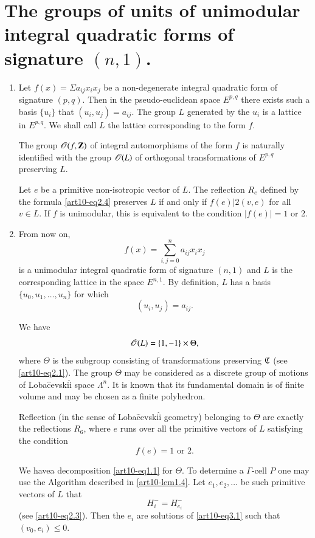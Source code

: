 \section{The groups of units of unimodular integral quadratic forms of signature $(n,1)$.}\label{art10-sec3}

\begin{enumerate}
\item Let $f(x) = \Sigma a_{ij} x_i x_j$ be a non-degenerate integral quadratic form of signature $(p,q)$. Then in the pseudo-euclidean space $E^{p,q}$ there exists such a basis $\{u_i\}$ that $(u_i, u_j) = a_{ij}$. The group $L$ generated by the $u_i$ is a lattice in $E^{p,q}$. We shall call $L$ the lattice corresponding to the form $f$.

The group $\mathscr{O}(f,\mathbf{Z})$ of integral automorphisms of the form $f$ is naturally identified with the group $\mathscr{O}(L)$ of orthogonal transformations of $E^{p,q}$ preserving $L$.

Let $e$ be a primitive non-isotropic vector of $L$. The reflection $R_e$ defined by the formula \eqref{art10-eq2.4} preserves $L$ if and only if $f(e) \big| 2(v,e)$ for all $v \in L$. If $f$ is unimodular, this is equivalent to the condition $|f(e)| = 1$ or 2. 

\item From now on,
$$
f(x) = \sum\limits^n_{i, j =0} a_{ij} x_i x_j
$$
is a unimodular integral quadratic form of signature $(n,1)$ and $L$ is the corresponding lattice in the space $E^{n,1}$. By definition, $L$ has a basis $\{u_0, u_1, \ldots, u_n\}$ for which
$$
(u_i, u_j) = a_{ij}.
$$

We have 
$$
\mathscr{O}(L) = \{1, -1\} \times \Theta,
$$
where $\Theta$ is the subgroup consisting of transformations preserving $\mathfrak{C}$ (see \ref{art10-eq2.1}). The group $\Theta$ may be considered as a discrete group of motions of Loba$\hat{\text{c}}$evski$\hat{\text{i}}$ space $\Lambda^n$. It is known \cite{art10-key2} that its fundamental domain is of finite volume and may be chosen as a finite polyhedron.

Reflection (in the sense of Loba$\hat{\text{c}}$evski$\hat{\text{i}}$ geometry) belonging to $\Theta$ are exactly the reflections $R_6$, where $e$ runs over all the primitive vectors of $L$ satisfying the condition
\setcounter{equation}{0}
\begin{equation}
f(e) = 1 \text{ or } 2. \label{art10-eq3.1}
\end{equation}

We have\pageoriginale a decomposition \eqref{art10-eq1.1} for $\Theta$. To determine a $\Gamma$-cell $P$ one may use the Algorithm described in \ref{art10-lem1.4}. Let $e_1, e_2, \ldots $ be such primitive vectors of $L$ that
$$
H^-_i = H^-_{e_i}
$$
(see \eqref{art10-eq2.3}). Then the $e_i$ are solutions of \eqref{art10-eq3.1} such that $(v_0, e_i) \leqslant 0$. 


\end{enumerate}
